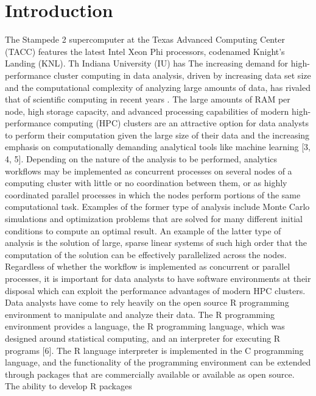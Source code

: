 \graphicspath{{plots/}}
\section{Introduction}

The Stampede 2 supercomputer at the Texas Advanced Computing Center (TACC) features the
latest Intel Xeon Phi processors, codenamed Knight's Landing (KNL). Th Indiana University
(IU) has  The increasing demand for high-performance cluster computing in data analysis,
driven by increasing data set size and the computational complexity of analyzing large
amounts of data, has rivaled that of scientific computing in recent years
\cite{fox:bdBenchmarking, kouzes:paradigm}.  The large amounts of RAM per node, high
storage capacity, and advanced processing capabilities of modern high-performance
computing (HPC) clusters are an attractive option for data analysts to perform their
computation given the large size of their data and the increasing emphasis on
computationally demanding analytical tools like machine learning [3, 4, 5].  Depending on
the nature of the analysis to be performed, analytics workflows may be implemented as
concurrent processes on several nodes of a computing cluster with little or no
coordination between them, or as highly coordinated parallel processes in which the nodes
perform portions of the same computational task. Examples of the former type of analysis
include Monte Carlo simulations and optimization problems that are solved for many
different initial conditions to compute an optimal result.  An example of the latter type
of analysis is the solution of large, sparse linear systems of such high order that the
computation of the solution can be effectively parallelized across the nodes. Regardless
of whether the workflow is implemented as concurrent or parallel processes, it is
important for data analysts to have software environments at their disposal which can
exploit the performance advantages of modern HPC clusters.  Data analysts have come to
rely heavily on the open source R programming environment to manipulate and analyze their
data.  The R programming environment provides a language, the R programming language,
which was designed around statistical computing, and an interpreter for executing R
programs [6].  The R language interpreter is implemented in the C programming language,
and the functionality of the programming environment can be extended through packages that
are commercially available or available as open source.  The ability to develop R packages
